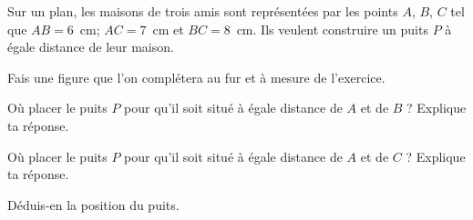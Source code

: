 Sur un plan, les maisons de trois amis sont représentées par les
points $A$, $B$, $C$ tel que $AB=6$~cm; $AC=7$~cm et $BC=8$~cm. Ils
veulent construire un puits $P$ à égale distance de leur maison.
\begin{myenumerate}
\item Fais une figure que l'on complétera au fur et à mesure de
l'exercice.
\item Où placer le puits $P$ pour qu'il soit situé à égale distance de
$A$ et de $B$ ? Explique ta réponse.
\item Où placer le puits $P$ pour qu'il soit situé à égale distance de
$A$ et de $C$ ? Explique ta réponse.
\item Déduis-en la position du puits.
\end{myenumerate}
